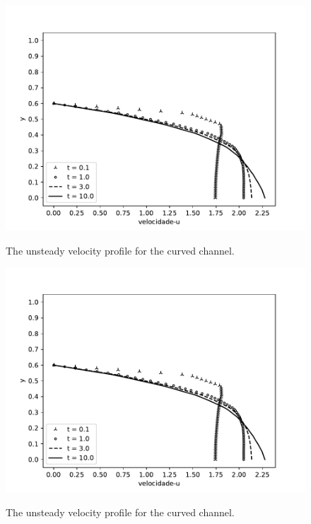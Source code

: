 \begin{figure}[H]
     \centering
     \includegraphics[scale=1]{./02_chaps/cap_solution/figure/vel_Curved_evol.pdf}\\
     \caption{The unsteady velocity profile for the curved channel.}
     \label{contraction velocity}
\end{figure}


\begin{figure}[H]
     \centering
     \includegraphics[scale=1]{./02_chaps/cap_solution/figure/vel_Curved_evol.pdf}\\
     \caption{The unsteady velocity profile for the curved channel.}
     \label{expansion velocity}
\end{figure}




\newpage
